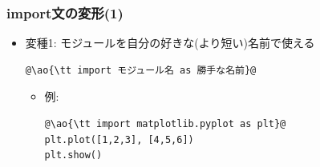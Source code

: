 \documentclass[10pt,dvipdfmx]{beamer}
\newcommand{\ao}[1]{{\color{blue}#1}}
\begin{document}

\begin{frame}[fragile]
\frametitle{import文の変形(1)}
\begin{itemize}
\item 変種1: モジュールを自分の好きな(より短い)名前で使える
\begin{lstlisting}
@\ao{\tt import モジュール名 as 勝手な名前}@
\end{lstlisting}
\begin{itemize}
\item 例:
\begin{lstlisting}
@\ao{\tt import matplotlib.pyplot as plt}@
plt.plot([1,2,3], [4,5,6])
plt.show()
\end{lstlisting}
\end{itemize}
\end{itemize}
\end{frame}
\end{document}
